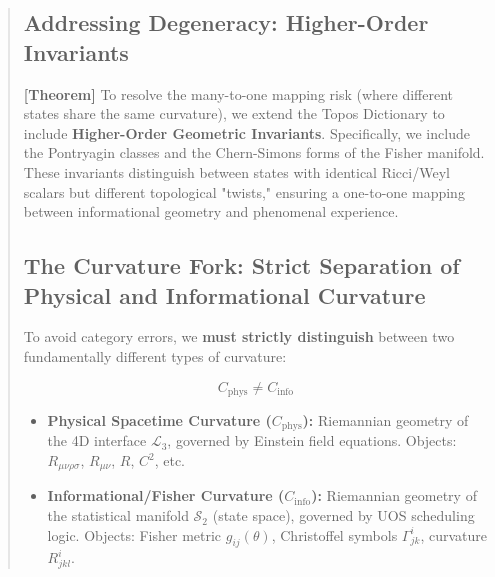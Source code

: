 \documentclass[11pt,titlepage]{article}
\newcommand{\tagtheo}{\textcolor{green!60!black}{\textbf{[Theorem]}} }
\begin{document}
\begin{abstract}
\subsection{Addressing Degeneracy: Higher-Order Invariants}
\tagtheo To resolve the many-to-one mapping risk (where different states share the same curvature), we extend the Topos Dictionary to include \textbf{Higher-Order Geometric Invariants}. Specifically, we include the Pontryagin classes and the Chern-Simons forms of the Fisher manifold. These invariants distinguish between states with identical Ricci/Weyl scalars but different topological "twists," ensuring a one-to-one mapping between informational geometry and phenomenal experience.



\subsection{The Curvature Fork: Strict Separation of Physical and Informational Curvature}
\label{sec:curvature-fork-strict}

\begin{tcolorbox}[colback=red!5!white,colframe=red!75!black,title=Critical Distinction (Enforced Throughout)]
To avoid category errors, we \textbf{must strictly distinguish} between two fundamentally different types of curvature:

\[
\boxed{C_{\mathrm{phys}} \neq C_{\mathrm{info}}}
\]

\begin{itemize}
\item \textbf{Physical Spacetime Curvature ($C_{\mathrm{phys}}$):} Riemannian geometry of the 4D interface $\mathcal{L}_3$, governed by Einstein field equations. Objects: $R_{\mu\nu\rho\sigma}$, $R_{\mu\nu}$, $R$, $C^2$, etc.

\item \textbf{Informational/Fisher Curvature ($C_{\mathrm{info}}$):} Riemannian geometry of the statistical manifold $\mathcal{S}_2$ (state space), governed by UOS scheduling logic. Objects: Fisher metric $g_{ij}(\theta)$, Christoffel symbols $\Gamma^i_{jk}$, curvature $R^i_{jkl}$.
\end{itemize}
\end{tcolorbox}


\end{abstract}
\end{document}
